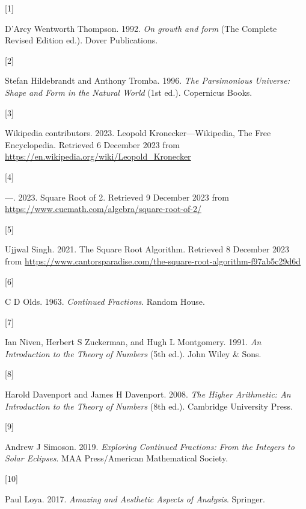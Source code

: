\documentclass[
  a4paper,
]{article}
\newlength{\cslhangindent}
\newlength{\csllabelwidth}
\newenvironment{CSLReferences}[2] %
 {\begin{list}{}{%
  \setlength{\itemindent}{0pt}
  \setlength{\leftmargin}{0pt}
  \setlength{\parsep}{0pt}
  \ifodd #1
   \setlength{\leftmargin}{\cslhangindent}
   \setlength{\itemindent}{-1\cslhangindent}
  \fi
  \setlength{\itemsep}{#2\baselineskip}}}
 {\end{list}}
\newcommand{\CSLLeftMargin}[1]{\parbox[t]{\csllabelwidth}{\strut#1\strut}}
\newcommand{\CSLRightInline}[1]{\parbox[t]{\linewidth - \csllabelwidth}{\strut#1\strut}}
\begin{document}
\label{refs}
\begin{CSLReferences}{0}{0}
\CSLLeftMargin{{[}1{]} }%
\CSLRightInline{D'Arcy Wentworth Thompson. 1992. \emph{On growth and
form} (The Complete Revised Edition ed.). Dover Publications.}

\CSLLeftMargin{{[}2{]} }%
\CSLRightInline{Stefan Hildebrandt and Anthony Tromba. 1996. \emph{{The
Parsimonious Universe: Shape and Form in the Natural World}} (1st ed.).
Copernicus Books.}

\CSLLeftMargin{{[}3{]} }%
\CSLRightInline{Wikipedia contributors. 2023. {Leopold
Kronecker---Wikipedia, The Free Encyclopedia}. Retrieved 6 December 2023
from \url{https://en.wikipedia.org/wiki/Leopold_Kronecker}}

\CSLLeftMargin{{[}4{]} }%
\CSLRightInline{---. 2023. {Square Root of 2}. Retrieved 9 December 2023
from \url{https://www.cuemath.com/algebra/square-root-of-2/}}

\CSLLeftMargin{{[}5{]} }%
\CSLRightInline{Ujjwal Singh. 2021. {The Square Root Algorithm}.
Retrieved 8 December 2023 from
\url{https://www.cantorsparadise.com/the-square-root-algorithm-f97ab5c29d6d}}

\CSLLeftMargin{{[}6{]} }%
\CSLRightInline{C D Olds. 1963. \emph{{Continued Fractions}}. Random
House.}

\CSLLeftMargin{{[}7{]} }%
\CSLRightInline{Ian Niven, Herbert S Zuckerman, and Hugh L Montgomery.
1991. \emph{{An Introduction to the Theory of Numbers}} (5th ed.). John
Wiley \& Sons.}

\CSLLeftMargin{{[}8{]} }%
\CSLRightInline{Harold Davenport and James H Davenport. 2008. \emph{{The
Higher Arithmetic}: {An Introduction to the Theory of Numbers}} (8th
ed.). Cambridge University Press.}

\CSLLeftMargin{{[}9{]} }%
\CSLRightInline{Andrew J Simoson. 2019. \emph{{Exploring Continued
Fractions}: {From the Integers to Solar Eclipses}}. MAA Press/American
Mathematical Society.}

\CSLLeftMargin{{[}10{]} }%
\CSLRightInline{Paul Loya. 2017. \emph{{Amazing and Aesthetic Aspects of
Analysis}}. Springer.}

\end{CSLReferences}
\end{document}
